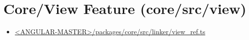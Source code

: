 \section{Core/View Feature (core/src/view)}



\begin{itemize}
  \item \href{https://github.com/angular/angular/blob/master/packages/core/src/linker/view_ref.ts}
        {<ANGULAR-MASTER>/packages/core/src/linker/view\_ref.ts}
\end{itemize}










